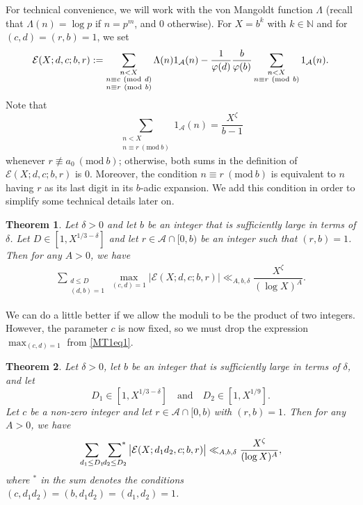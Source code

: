 \documentclass[12pt]{amsart}
\numberwithin{equation}{section}
\newtheorem{thm}{Theorem}
\theoremstyle{remark}
\theoremstyle{definition}
\newcommand{\imod}[1]{\ (\mathrm{mod}\ #1)}
\begin{document}
For technical convenience, we will work with the von Mangoldt function $\Lambda$ (recall that $\Lambda(n)=\log p$ if $n=p^m$, and $0$ otherwise). For $X=b^k$ with $k\in \mathbb{N}$ and for $(c, d)=(r, b)=1$, we set
\begin{align}
\notag \mathcal{E}(X; d, c; b, r):=\sum_{\substack{n < X\\n\equiv c \imod d\\n\equiv r\imod b}}\Lambda(n)1_{\mathcal{A}}(n) - \dfrac{1}{\varphi(d)}\dfrac{b}{\varphi(b)}\sum_{\substack{n<X\\n\equiv r\imod b}}1_{\mathcal{A}}(n).
\end{align}
Note that
\[\sum_{\substack{n<X\\ n\equiv r\imod b}}1_{\mathcal{A}}(n) = \dfrac{X^{\zeta}}{b-1}\]
whenever $r\not\equiv a_0\imod b$; otherwise, both sums in the definition of $\mathcal{E}(X; d, c;b,r)$ is $0$. Moreover, the condition $n\equiv r\imod b$ is equivalent to $n$ having $r$ as its last digit in its $b$-adic expansion. We add this condition in order to simplify some technical details later on.



\begin{thm}\label{Main Theorem}
Let $\delta>0$ and let $b$ be an integer that is sufficiently large in terms of $\delta$. Let $D\in [1, X^{1/3-\delta}]$ and let $r\in \mathcal{A}\cap[0, b)$ be an integer such that $(r, b)=1$. Then for any $A>0$, we have
\begin{align}
\label{MT1eq1} \sum_{\substack{d\leq D\\(d,b)=1}}\max_{(c,d)=1}\big|\mathcal{E}(X;d,c;b,r)\big| \ll_{A, b, \delta} \dfrac{X^{\zeta}}{(\log X)^A}.
\end{align}
\end{thm}



We can do a little better if we allow the moduli to be the product of two integers. However, the parameter $c$ is now fixed, so we must drop the expression $\max_{(c, d)=1}$ from \eqref{MT1eq1}.



\begin{thm}\label{Main Theorem2}
Let $\delta>0$,  let $b$ be an integer that is sufficiently large in terms of $\delta$, and let 
\[D_1\in [1, X^{1/3-\delta}] \quad \text{and} \quad D_2\in [1, X^{1/9}].\]
Let $c$ be a non-zero integer and let $r\in \mathcal{A}\cap[0, b)$ with $(r, b)=1$. Then for any $A>0$, we have
\begin{align}
\notag \sum_{\substack{d_1\leq D_1}} \sideset{}{^*}\sum_{\substack{d_2\leq D_2}}\big|\mathcal{E}(X; d_1d_2, c; b, r)\big| \ll_{A, b, \delta} \dfrac{X^{\zeta}}{(\log X)^A},
\end{align}
where $^*$ in the sum denotes the conditions $(c,d_1d_2)=(b,d_1d_2)=(d_1, d_2)=1$.
\end{thm}
\end{document}
